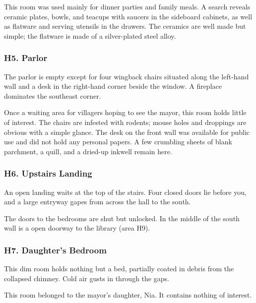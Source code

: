 \documentclass[10pt,a4paper,twoside,bg=print,twocolumn,openany,nodeprecatedcode]{dndbook}
\begin{document}
This room was used mainly for dinner parties and family meals. A search reveals ceramic plates, bowls, and teacups with saucers in the sideboard cabinets, as well as flatware and serving utensils in the drawers. The ceramics are well made but simple; the flatware is made of a silver-plated steel alloy.

\subsubsection{H5. Parlor}
\begin{DndReadAloud}{}
The parlor is empty except for four wingback chairs situated along the left-hand wall and a desk in the right-hand corner beside the window. A fireplace dominates the southeast corner.

\end{DndReadAloud}

Once a waiting area for villagers hoping to see the mayor, this room holds little of interest. The chairs are infested with rodents; mouse holes and droppings are obvious with a simple glance. The desk on the front wall was available for public use and did not hold any personal papers. A few crumbling sheets of blank parchment, a quill, and a dried-up inkwell remain here.

\subsubsection{H6. Upstairs Landing}
\begin{DndReadAloud}{}
An open landing waits at the top of the stairs. Four closed doors lie before you, and a large entryway gapes from across the hall to the south.

\end{DndReadAloud}

The doors to the bedrooms are shut but unlocked. In the middle of the south wall is a open doorway to the library (area H9).

\subsubsection{H7. Daughter's Bedroom}
\begin{DndReadAloud}{}
This dim room holds nothing but a bed, partially coated in debris from the collapsed chimney. Cold air gusts in through the gaps.

\end{DndReadAloud}

This room belonged to the mayor's daughter, Nia. It contains nothing of interest.
\end{document}
